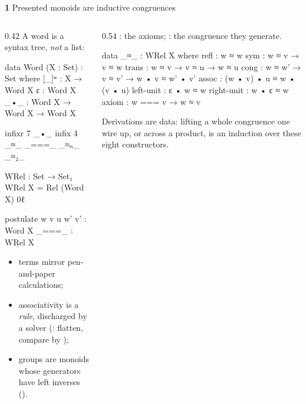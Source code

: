 \begin{frame}{\textbf{1}\; Presented monoids are inductive congruences}
\begin{columns}[c]
\begin{column}{0.42\textwidth}
A word is a syntax tree, \emph{not} a list:
\begin{code}
data Word (X : Set) : Set where
  [_]ʷ : X → Word X
  ε    : Word X
  _•_  : Word X → Word X → Word X
\end{code}
\begin{code}[hide]
infixr 7 _•_
infix 4 _≈_ _===_ _≈ₙ_ _≈₂_

WRel : Set → Set₁
WRel X = Rel (Word X) 0ℓ

postulate
  w v u w' v' : Word X
  _===_       : WRel X
\end{code}
\vspace{2pt}
\footnotesize
\begin{itemize}
  \item terms mirror pen-and-paper calculations;
  \item associativity is a \emph{rule}, discharged by a solver
        (: flatten, compare by );
  \item groups are monoids whose generators have left inverses
        ().
\end{itemize}
\end{column}
\begin{column}{0.54\textwidth}
{\small \aid{\_===\_}: the axioms; : the congruence they generate.}
\renewcommand{\AgdaCodeStyle}{\footnotesize}
\begin{code}
data _≈_ : WRel X where
  refl  : w ≈ w
  sym   : w ≈ v → v ≈ w
  trans : w ≈ v → v ≈ u → w ≈ u
  cong  : w ≈ w' → v ≈ v' → w • v ≈ w' • v'
  assoc      : (w • v) • u ≈ w • (v • u)
  left-unit  : ε • w ≈ w
  right-unit : w • ε ≈ w
  axiom      : w === v → w ≈ v
\end{code}
\begin{win}
\small Derivations are \alert{data}: lifting a whole congruence one wire up, or
across a product, is an induction over these eight constructors.
\end{win}
\end{column}
\end{columns}
\end{frame}

